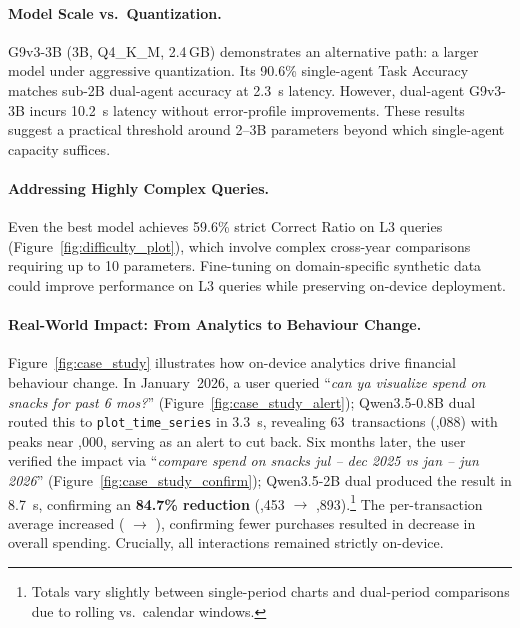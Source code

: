 \documentclass[11pt,twocolumn]{article}
\begin{document}
\paragraph{Model Scale vs.\ Quantization.}
G9v3-3B (3B, Q4\_K\_M, 2.4\,GB) demonstrates an alternative path: a larger model under aggressive quantization.
Its 90.6\% single-agent Task Accuracy matches sub-2B dual-agent accuracy at 2.3~s latency.
However, dual-agent G9v3-3B incurs 10.2~s latency without error-profile improvements.
These results suggest a practical threshold around 2--3B parameters beyond which single-agent capacity suffices.

\paragraph{Addressing Highly Complex Queries.}
Even the best model achieves 59.6\% strict Correct Ratio on L3 queries (Figure~\ref{fig:difficulty_plot}), which involve complex cross-year comparisons requiring up to 10 parameters.
Fine-tuning on domain-specific synthetic data \citep{liu2024apigen} could improve performance on L3 queries while preserving on-device deployment.

\paragraph{Real-World Impact: From Analytics to Behaviour Change.}
Figure~\ref{fig:case_study} illustrates how on-device analytics drive financial behaviour change.
In January~2026, a user queried ``\emph{can ya visualize spend on snacks for past 6 mos?}'' (Figure~\ref{fig:case_study_alert}); Qwen3.5-0.8B dual routed this to \texttt{plot\_time\_series} in 3.3~s, revealing 63~transactions (,088) with peaks near ,000, serving as an alert to cut back.
Six months later, the user verified the impact via ``\emph{compare spend on snacks jul -- dec 2025 vs jan -- jun 2026}'' (Figure~\ref{fig:case_study_confirm}); Qwen3.5-2B dual produced the result in 8.7~s, confirming an \textbf{84.7\% reduction} (,453 $\to$ ,893).\footnote{Totals vary slightly between single-period charts and dual-period comparisons due to rolling vs.\ calendar windows.}
The per-transaction average increased ( $\to$ ), confirming fewer purchases resulted in decrease in overall spending.
Crucially, all interactions remained strictly on-device.



\vspace{-4pt}
\end{document}
